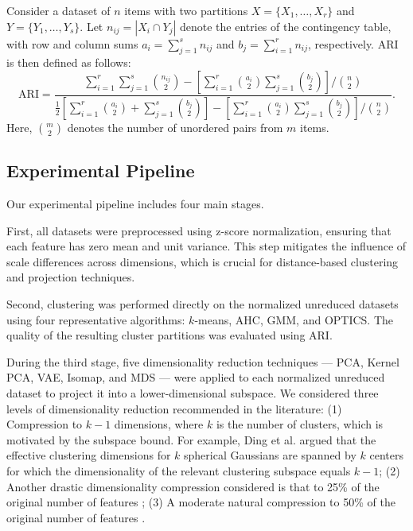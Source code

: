 \documentclass[preprint,12pt]{elsarticle}
\begin{document}
Consider a dataset of $n$ items with two partitions $X=\{X_1,\dots,X_r\}$ and $Y=\{Y_1,\dots,Y_s\}$. Let $n_{ij}=|X_i \cap Y_j|$ denote the entries of the contingency table, with row and column sums $a_i=\sum_{j=1}^{s} n_{ij}$ and $b_j=\sum_{i=1}^{r} n_{ij}$, respectively. ARI is then defined as follows:
\begin{equation}
\label{eq:ari}
\mathrm{ARI} =
\frac{\sum_{i=1}^{r}\sum_{j=1}^{s} \binom{n_{ij}}{2}
- \left[ \sum_{i=1}^{r} \binom{a_i}{2} \sum_{j=1}^{s} \binom{b_j}{2} \right] \! / \binom{n}{2}}
{\frac{1}{2}\!\left[ \sum_{i=1}^{r} \binom{a_i}{2} + \sum_{j=1}^{s} \binom{b_j}{2} \right]
- \left[ \sum_{i=1}^{r} \binom{a_i}{2} \sum_{j=1}^{s} \binom{b_j}{2} \right] \! / \binom{n}{2}}.
\end{equation}
Here, $\binom{m}{2}$ denotes the number of unordered pairs from $m$ items.

\subsection{Experimental Pipeline}\label{subsec:exp_setup}

Our experimental pipeline includes four main stages.

First, all datasets were preprocessed using z-score normalization, ensuring that each feature has zero mean and unit variance. This step mitigates the influence of scale differences across dimensions, which is crucial for distance-based clustering and projection techniques. 

Second, clustering was performed directly on the normalized unreduced datasets using four representative algorithms: $k$-means, AHC, GMM, and OPTICS. The quality of the resulting cluster partitions was evaluated using ARI.

During the third stage, five dimensionality reduction techniques — PCA, Kernel PCA, VAE, Isomap, and MDS — were applied to each normalized unreduced dataset to project it into a lower-dimensional subspace. We considered three levels of dimensionality reduction recommended in the literature: 
(1) Compression to $k-1$ dimensions, where $k$ is the number of clusters, which is motivated by the subspace bound. For example, Ding et al. \cite{ding2002adaptive} argued that the effective clustering dimensions for $k$ spherical Gaussians are spanned by $k$ centers for which the dimensionality of the relevant clustering subspace equals $k-1$;
(2) Another drastic dimensionality compression considered is that to 25\% of the original number of features \cite{tang2005comparing, karypis2000concept}; 
(3) A moderate natural compression to 50\% of the original number of features \cite{hasan2021review}.
\end{document}
